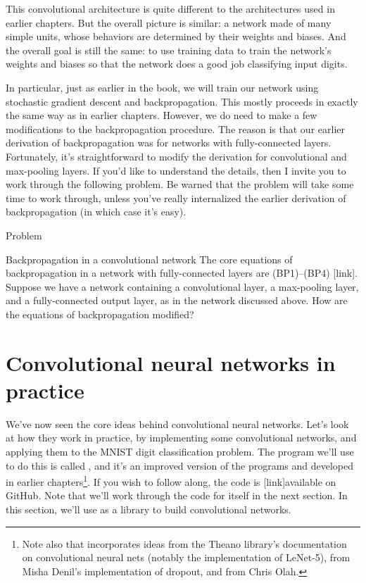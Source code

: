 \documentclass[a4paper,twoside,10pt]{book}
\begin{document}
This convolutional architecture is quite different to the architectures used in earlier chapters. But the overall picture is similar: a network made of many simple units, whose behaviors are determined by their weights and biases. And the overall goal is still the same: to use training data to train the network's weights and biases so that the network does a good job classifying input digits.

In particular, just as earlier in the book, we will train our network using stochastic gradient descent and backpropagation. This mostly proceeds in exactly the same way as in earlier chapters. However, we do need to make a few modifications to the backpropagation procedure. The reason is that our earlier derivation of backpropagation was for networks with fully-connected layers. Fortunately, it's straightforward to modify the derivation for convolutional and max-pooling layers. If you'd like to understand the details, then I invite you to work through the following problem. Be warned that the problem will take some time to work through, unless you've really internalized the earlier derivation of backpropagation (in which case it's easy).

\begin{exercize}{Problem}
	\item Backpropagation in a convolutional network The core equations of backpropagation in a network with fully-connected layers are (BP1)--(BP4) [link]. Suppose we have a network containing a convolutional layer, a max-pooling layer, and a fully-connected output layer, as in the network discussed above. How are the equations of backpropagation modified?
\end{exercize}
\section{Convolutional neural networks in practice}
We've now seen the core ideas behind convolutional neural networks. Let's look at how they work in practice, by implementing some convolutional networks, and applying them to the MNIST digit classification problem. The program we'll use to do this is called , and it's an improved version of the programs  and  developed in earlier chapters\footnote{Note also that  incorporates ideas from the Theano library's documentation on convolutional neural nets (notably the implementation of LeNet-5), from Misha Denil's implementation of dropout, and from Chris Olah.}. If you wish to follow along, the code is [link]available on GitHub. Note that we'll work through the code for  itself in the next section. In this section, we'll use  as a library to build convolutional networks.
\end{document}
